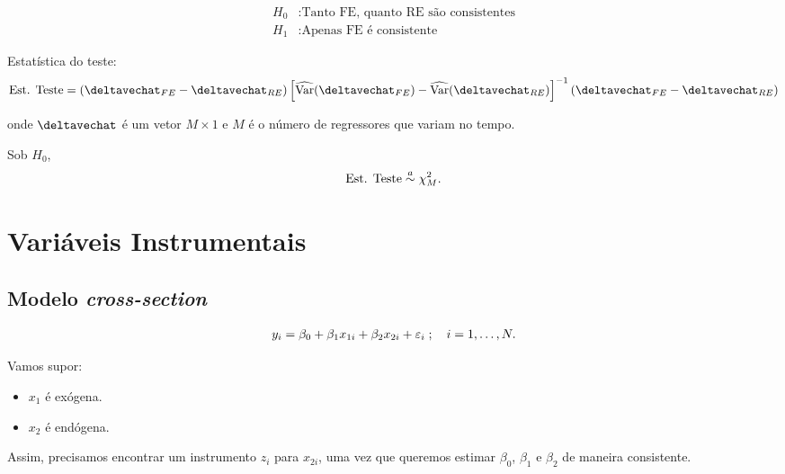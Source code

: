 \documentclass[11pt, oneside, a4paper, article]{article}
\numberwithin{equation}{section}
\begin{document}
\begin{description}
\begin{align*}
H_{0}&: \text{Tanto FE, quanto RE são consistentes}
\\    
H_{1}&: \text{Apenas FE é consistente}
\end{align*}

Estatística do teste:
\begin{align*}
\text{Est. Teste} =
\left( \deltavechat_{FE} - \deltavechat_{RE}  \right)
\left[ \Varhat(\deltavechat_{FE}) - \Varhat(\deltavechat_{RE})  \right]^{-1}
\left( \deltavechat_{FE} - \deltavechat_{RE}  \right)
\end{align*}

\noindent
onde $\deltavechat$ é um vetor $M \times 1$ e $M$ é o número de regressores que variam no tempo.

\noindent
Sob $H_{0}$, 
\begin{align*}
\text{Est. Teste} \overset{a}{\sim} \chi^{2}_{M}.
\end{align*}

\clearpage
\section{Variáveis Instrumentais}

\subsection{Modelo \textit{cross-section}}

\vspace{-2 em}
\begin{align} \label{iv:mod}
y_{i} = \beta_{0} + \beta_{1} x_{1i} + \beta_{2} x_{2i} + \varepsilon_{i}
\; ; \quad i = 1, \dots, N.
\end{align}

\noindent
Vamos supor: 

\vspace{-1 em}
\begin{itemize}[noitemsep]
\item[] $x_{1}$ é exógena.
\item[] $x_{2}$ é endógena.
\end{itemize}

Assim, precisamos encontrar um instrumento $z_{i}$ para $x_{2i}$, uma vez que queremos estimar $\beta_{0}$, $\beta_{1}$ e $\beta_{2}$ de maneira consistente.


\end{description}
\end{document}

